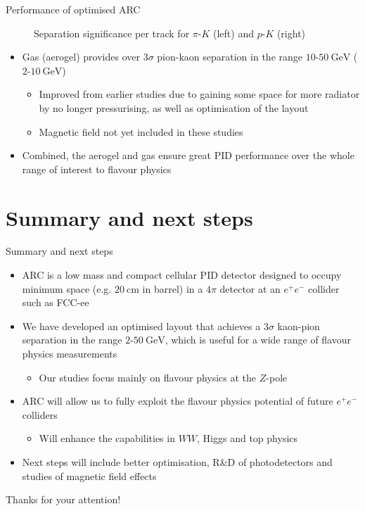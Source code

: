 \documentclass{beamer}
\begin{document}
\begin{frame}{Performance of optimised ARC}
\begin{figure}
\begin{subfigure}{0.5\textwidth}
    \end{subfigure}
    \vspace{-0.4cm}
    \caption{Separation significance per track for $\pi$-$K$ (left) and $p$-$K$ (right)}
  \end{figure}
  \vspace{-0.4cm}
  \begin{itemize}
    \setlength\itemsep{0.0em}
    \item{Gas (aerogel) provides over $3\sigma$ pion-kaon separation in the range $10$-$\SI{50}{\giga\eV}$ ($2$-$\SI{10}{\giga\eV}$)}
    \begin{itemize}
      \item{Improved from earlier studies due to gaining some space for more radiator by no longer pressurising, as well as optimisation of the layout}
      \item{Magnetic field not yet included in these studies}
    \end{itemize}
    \item{Combined, the aerogel and gas ensure great PID performance over the whole range of interest to flavour physics}
  \end{itemize}
\end{frame}

\section{Summary and next steps}
\begin{frame}{Summary and next steps}
  \begin{itemize}
    \setlength\itemsep{1.0em}
    \item{ARC is a low mass and compact cellular PID detector designed to occupy minimum space (e.g. $\SI{20}{\centi\meter}$ in barrel) in a $4\pi$ detector at an $e^+e^-$ collider such as FCC-ee}
    \item{We have developed an optimised layout that achieves a $3\sigma$ kaon-pion separation in the range $2$-$\SI{50}{\giga\eV}$, which is useful for a wide range of flavour physics measurements}
    \begin{itemize}
      \item{Our studies focus mainly on flavour physics at the $Z$-pole}
    \end{itemize}
    \item{ARC will allow us to fully exploit the flavour physics potential of future $e^+e^-$ colliders}
    \begin{itemize}
      \item{Will enhance the capabilities in $WW$, Higgs and top physics}
    \end{itemize}
    \item{Next steps will include better optimisation, R\&D of photodetectors and studies of magnetic field effects}
  \end{itemize}
  \begin{center}
    \huge Thanks for your attention!
  \end{center}
\end{frame}
\end{document}
